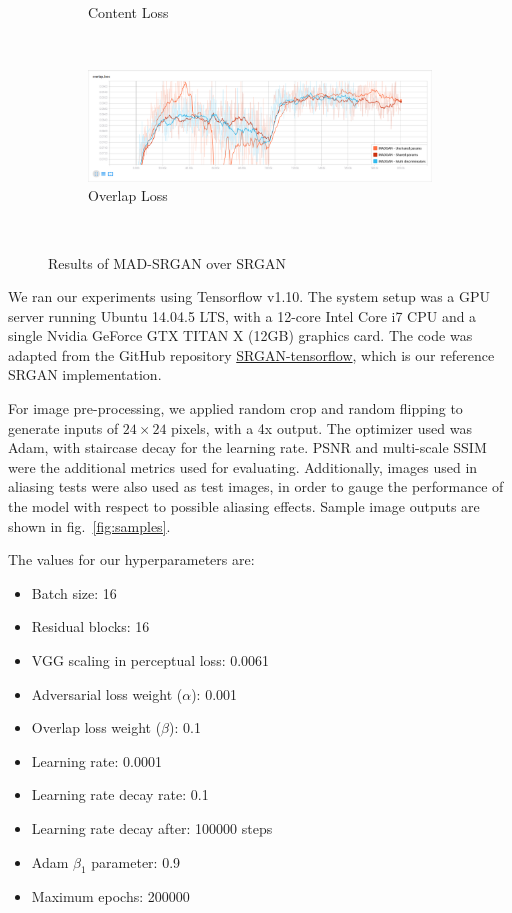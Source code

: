 \documentclass[12pt,a4paper,twocolumn]{article}
\begin{document}
\begin{figure}
\begin{subfigure}{0.48\textwidth}
                \caption{Content Loss}
            \end{subfigure}\\[5mm]
            \begin{subfigure}{0.48\textwidth}
                \includegraphics[width=\textwidth]{images/ovrl-loss.png}
                \caption{Overlap Loss}
            \end{subfigure}\\[2mm]
            \caption{Results of MAD-SRGAN over SRGAN}
            \label{fig:results}
        \end{figure}

        We ran our experiments using Tensorflow \cite{tensorflow} v1.10.
        The system setup was a GPU server running Ubuntu 14.04.5 LTS, with a 12-core Intel Core i7 CPU and a single Nvidia GeForce GTX TITAN X (12GB) graphics card.
        The code was adapted from the GitHub repository \href{https://github.com/brade31919/SRGAN-tensorflow}{SRGAN-tensorflow}, which is our reference SRGAN implementation.

        For image pre-processing, we applied random crop and random flipping to generate inputs of $24 \times 24$ pixels, with a 4x output.
        The optimizer used was Adam, with staircase decay for the learning rate.
        PSNR and multi-scale SSIM \cite{msssim} were the additional metrics used for evaluating.
        Additionally, images used in aliasing tests were also used as test images, in order to gauge the performance of the model with respect to possible aliasing effects.
        Sample image outputs are shown in fig.~\ref{fig:samples}.

        The values for our hyperparameters are:
        \begin{itemize}
            \item Batch size: 16
            \item Residual blocks: 16
            \item VGG scaling in perceptual loss: 0.0061
            \item Adversarial loss weight ($\alpha$): 0.001
            \item Overlap loss weight ($\beta$): 0.1
            \item Learning rate: 0.0001
            \item Learning rate decay rate: 0.1
            \item Learning rate decay after: 100000 steps
            \item Adam $\beta_1$ parameter: 0.9
            \item Maximum epochs: 200000
        \end{itemize}
\end{document}
